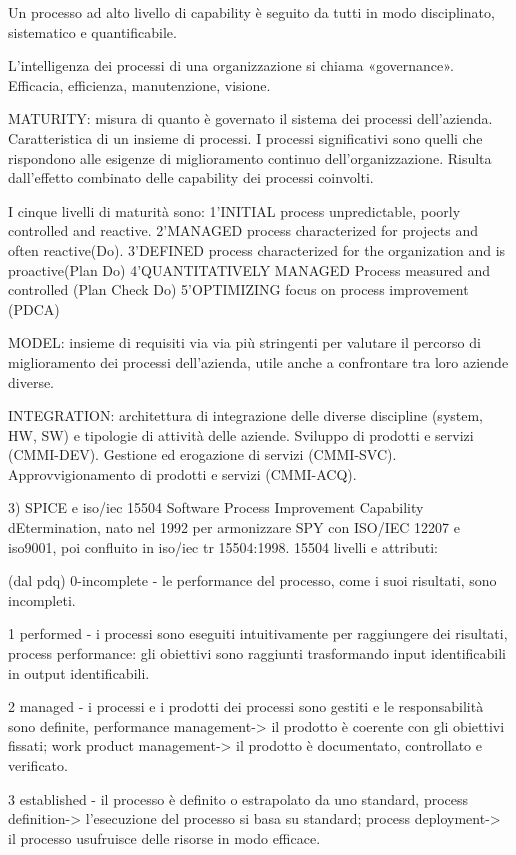 \documentclass{report}
\begin{document}
Un processo ad alto livello di capability è seguito da tutti in modo disciplinato, sistematico e quantificabile.


L’intelligenza dei processi di una organizzazione si chiama «governance».
Efficacia, efficienza, manutenzione, visione.

MATURITY: misura di quanto è governato il sistema dei processi dell’azienda.
Caratteristica di un insieme di processi.
I processi significativi sono quelli che rispondono alle esigenze di miglioramento continuo dell’organizzazione. 
Risulta dall’effetto combinato delle capability dei processi coinvolti.

I cinque livelli di maturità sono:
1'INITIAL process unpredictable, poorly controlled and reactive.
2'MANAGED process characterized for projects and often reactive(Do).
3'DEFINED process characterized for the organization and is proactive(Plan Do)
4'QUANTITATIVELY MANAGED Process measured and controlled (Plan Check Do)
5'OPTIMIZING focus on process improvement (PDCA)

MODEL: insieme di requisiti via via più stringenti per valutare il percorso di miglioramento dei processi dell’azienda, utile anche a confrontare tra loro aziende diverse.

INTEGRATION: architettura di integrazione delle diverse discipline (system, HW, SW) e tipologie di attività delle aziende.
Sviluppo di prodotti e servizi (CMMI-DEV).
Gestione ed erogazione di servizi (CMMI-SVC).
Approvvigionamento di prodotti e servizi (CMMI-ACQ).


3) SPICE e iso/iec 15504
Software Process Improvement Capability dEtermination, nato nel 1992 per armonizzare SPY con ISO/IEC 12207 e iso9001, poi confluito in iso/iec tr 15504:1998. 15504 livelli e attributi:

(dal pdq)
0-incomplete - le performance del processo, come i suoi risultati, sono incompleti.

1 performed - i processi sono eseguiti intuitivamente per raggiungere dei risultati,
process performance: gli obiettivi sono raggiunti trasformando input identificabili in output identificabili.

2 managed - i processi e i prodotti dei processi sono gestiti e le responsabilità sono definite,
performance management-> il prodotto è coerente con gli obiettivi fissati;
work product management-> il prodotto è documentato, controllato e verificato.

3 established - il processo è definito o estrapolato da uno standard,
process definition-> l’esecuzione del processo si basa su standard;
process deployment-> il processo usufruisce delle risorse in modo efficace.
\end{document}
